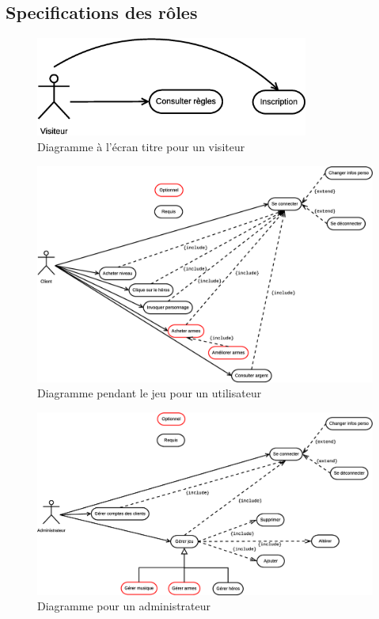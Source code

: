 \subsection{Specifications des rôles}

    \begin{figure}[ht!]
        \centering
            \includegraphics[width=0.8\textwidth]{images/utilisation1.eps}
        \caption{Diagramme à l'écran titre pour un visiteur}
    \end{figure}

    \begin{figure}[ht!]
        \centering
            \includegraphics[width=1\textwidth]{images/utilisation2.eps}
        \caption{Diagramme pendant le jeu pour un utilisateur}
    \end{figure}

    \newpage

    \begin{figure}[ht!]
        \centering
            \includegraphics[width=1\textwidth]{images/utilisation3.eps}
        \caption{Diagramme pour un administrateur}
    \end{figure}
